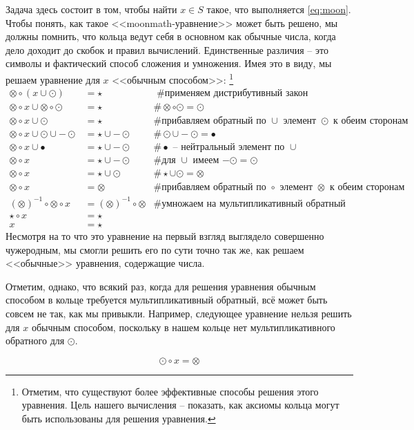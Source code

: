 \begin{example}
Задача здесь состоит в том, чтобы найти $x\in S$ такое, что выполняется \eqref{eq:moon}. Чтобы понять, как такое <<moonmath-уравнение>> может быть решено, мы должны помнить, что кольца ведут себя в основном как обычные числа, когда дело доходит до скобок и правил вычислений. Единственные различия -- это символы и фактический способ сложения и умножения. Имея это в виду, мы решаем уравнение для $x$ <<обычным способом>>: \footnote{Отметим, что существуют более эффективные способы решения этого уравнения. Цель нашего вычисления -- показать, как аксиомы кольца могут быть использованы для решения уравнения.}
\begin{align*}
\otimes \circ (x \cup \odot ) &= \star & \text{ \# применяем дистрибутивный закон}\\
\otimes \circ x \cup \otimes \circ \odot  &= \star &\# \otimes \circ \odot = \odot\\
\otimes \circ x \cup \odot  &= \star & \text{\# прибавляем обратный по $\cup$ элемент $\odot$ к обеим сторонам}\\
\otimes \circ x \cup \odot \cup -\odot  &= \star \cup -\odot & \# \odot \cup -\odot = \bullet\\
\otimes \circ x \cup \bullet &= \star \cup -\odot & \text{\# $\bullet$ -- нейтральный элемент по $\cup$}\\
\otimes \circ x &= \star \cup -\odot & \text{\# для $\cup$ имеем $-\odot = \odot$} \\
\otimes \circ x &= \star \cup \odot &\# \star \cup \odot = \otimes \\
\otimes \circ x &= \otimes  &\text{\# прибавляем обратный по $\circ$ элемент $\otimes$ к обеим сторонам}\\
(\otimes)^{-1}\circ \otimes \circ x &= (\otimes)^{-1}\circ \otimes & \text{\# умножаем на мультипликативный обратный}\\
\star \circ x &= \star\\
x &= \star
\end{align*}
Несмотря на то что это уравнение на первый взгляд выглядело совершенно чужеродным, мы смогли решить его по сути точно так же, как решаем <<обычные>> уравнения, содержащие числа.

Отметим, однако, что всякий раз, когда для решения уравнения обычным способом в кольце требуется мультипликативный обратный, всё может быть совсем не так, как мы привыкли. Например, следующее уравнение нельзя решить для $x$ обычным способом, поскольку в нашем кольце нет мультипликативного обратного для $\odot$.

\begin{equation}
\odot \circ x = \otimes
\end{equation}


\end{example}
